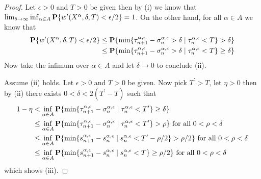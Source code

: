 \begin{proof}
Let $\epsilon > 0$ and $T > 0$ be given then by (i) we know that $\lim_{\delta \to \infty} \inf_{\alpha \in A} \textbf{P}\{w^{\prime}(X^\alpha, \delta, T) < \epsilon/2\} = 1$.  On the other hand,
for all $\alpha \in A$ we know that 
\begin{align*}
\textbf{P}\{w^{\prime}(X^\alpha, \delta, T) < \epsilon/2\} &\leq 
\textbf{P}\{\min \lbrace \tau^{\alpha, \epsilon}_{n+1} - \sigma^{\alpha, \epsilon}_n > \delta \mid \tau^{\alpha, \epsilon}_n < T \rbrace > \delta\} \\
&\leq
\textbf{P}\{\min \lbrace \tau^{\alpha, \epsilon}_{n+1} - \sigma^{\alpha, \epsilon}_n > \delta \mid \tau^{\alpha, \epsilon}_n < T \rbrace \geq \delta\} \\
\end{align*}
Now take the infimum over $\alpha \in A$ and let $\delta \to 0$ to conclude (ii).

Assume (ii) holds.  Let $\epsilon > 0$ and $T > 0$ be given.  Now pick $T^\prime > T$, let $\eta > 0$ then by (ii) there exists $0 < \delta < 2(T^\prime - T)$ such that 
\begin{align*}
1 - \eta &< \inf_{\alpha \in A} \textbf{P}\{\min \lbrace \tau^{\alpha, \epsilon}_{n+1} - \sigma^{\alpha, \epsilon}_n \mid \tau^{\alpha, \epsilon}_n < T^\prime \rbrace \geq \delta\} \\
&\leq \inf_{\alpha \in A} \textbf{P}\{\min \lbrace \tau^{\alpha, \epsilon}_{n+1} - \sigma^{\alpha, \epsilon}_n \mid \tau^{\alpha, \epsilon}_n < T^\prime \rbrace > \rho\}  \text{ for all $0 < \rho < \delta$}\\
&\leq \inf_{\alpha \in A} \textbf{P}\{\min \lbrace s^{\alpha, \epsilon}_{n+1} - s^{\alpha, \epsilon}_n \mid s^{\alpha, \epsilon}_n < T^\prime - \rho/2 \rbrace > \rho/2\}  \text{ for all $0 < \rho < \delta$} \\
&\leq \inf_{\alpha \in A} \textbf{P}\{\min \lbrace s^{\alpha, \epsilon}_{n+1} - s^{\alpha, \epsilon}_n \mid s^{\alpha, \epsilon}_n < T \rbrace \geq \rho/2\}  \text{ for all $0 < \rho < \delta$} \\
\end{align*}
which shows (iii).


\end{proof}
